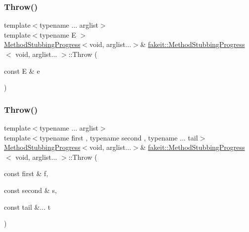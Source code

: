 \mbox{\label{structfakeit_1_1MethodStubbingProgress_3_01void_00_01arglist_8_8_8_01_4_a8b0d920dc6424eadd7dce7cb9df66814}} 
\subsubsection{\texorpdfstring{Throw()}{Throw()}\hspace{0.1cm}{\footnotesize\ttfamily [16/27]}}
{\footnotesize\ttfamily template$<$typename ... arglist$>$ \\
template$<$typename E $>$ \\
\mbox{\hyperlink{structfakeit_1_1MethodStubbingProgress}{Method\+Stubbing\+Progress}}$<$void, arglist...$>$\& \mbox{\hyperlink{structfakeit_1_1MethodStubbingProgress}{fakeit\+::\+Method\+Stubbing\+Progress}}$<$ void, arglist... $>$\+::Throw (\begin{DoxyParamCaption}\item[{const E \&}]{e }\end{DoxyParamCaption})\hspace{0.3cm}{\ttfamily [inline]}}

\mbox{\label{structfakeit_1_1MethodStubbingProgress_3_01void_00_01arglist_8_8_8_01_4_a2db97b61a39cc6cecc379f6d51234c8a}} 
\subsubsection{\texorpdfstring{Throw()}{Throw()}\hspace{0.1cm}{\footnotesize\ttfamily [17/27]}}
{\footnotesize\ttfamily template$<$typename ... arglist$>$ \\
template$<$typename first , typename second , typename ... tail$>$ \\
\mbox{\hyperlink{structfakeit_1_1MethodStubbingProgress}{Method\+Stubbing\+Progress}}$<$void, arglist...$>$\& \mbox{\hyperlink{structfakeit_1_1MethodStubbingProgress}{fakeit\+::\+Method\+Stubbing\+Progress}}$<$ void, arglist... $>$\+::Throw (\begin{DoxyParamCaption}\item[{const first \&}]{f,  }\item[{const second \&}]{s,  }\item[{const tail \&...}]{t }\end{DoxyParamCaption})\hspace{0.3cm}{\ttfamily [inline]}}

